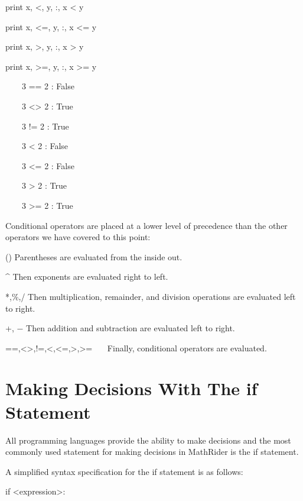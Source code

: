 \documentclass[12pt,oneside]{book}
\begin{document}
print x, {\textquotedbl}{\textless}{\textquotedbl}, y, {\textquotedbl}:{\textquotedbl}, x {\textless} y

print x, {\textquotedbl}{\textless}={\textquotedbl}, y, {\textquotedbl}:{\textquotedbl}, x {\textless}= y

print x, {\textquotedbl}{\textgreater}{\textquotedbl}, y, {\textquotedbl}:{\textquotedbl}, x {\textgreater} y

print x, {\textquotedbl}{\textgreater}={\textquotedbl}, y, {\textquotedbl}:{\textquotedbl}, x {\textgreater}= y

{\textbar}

\ \ \ \ 3 == 2 : False

\ \ \ \ 3 {\textless}{\textgreater} 2 : True

\ \ \ \ 3 != 2 : True

\ \ \ \ 3 {\textless} 2 : False

\ \ \ \ 3 {\textless}= 2 : False

\ \ \ \ 3 {\textgreater} 2 : True

\ \ \ \ 3 {\textgreater}= 2 : True


Conditional operators are placed at a lower level of precedence than the other operators we have covered to this point:


() Parentheses are evaluated from the inside out.


\^{} Then exponents are evaluated right to left.


*,\%,/ Then multiplication, remainder, and division operations are evaluated left to right.


+, $-$ Then addition and subtraction are evaluated left to right.


==,{\textless}{\textgreater},!=,{\textless},{\textless}=,{\textgreater},{\textgreater}=
\ \ \ Finally, conditional operators are evaluated.

\section[Making Decisions With The if Statement]{Making Decisions With The if Statement}

All programming languages provide the ability to make decisions and the most commonly used statement for making decisions in MathRider is the if statement. 

A simplified syntax specification for the if statement is as follows:


if {\textless}expression{\textgreater}:
\end{document}
